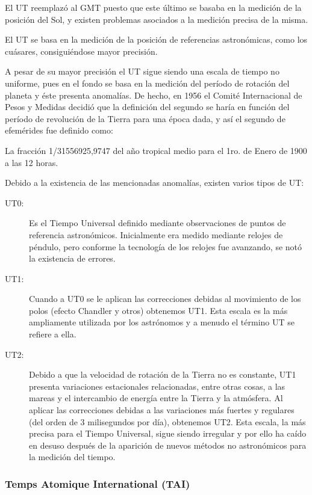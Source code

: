\documentclass[a4paper,12pt,twoside]{article}
\begin{document}
El UT reemplaz\'o al GMT puesto que este \'ultimo se basaba en la medici\'on de la posici\'on del Sol, y existen problemas asociados a la medici\'on precisa de la misma.

El UT se basa en la medici\'on de la posici\'on de referencias astron\'omicas, como los cu\'asares, consigui\'endose mayor precisi\'on.

 A pesar de su mayor precisión el UT sigue siendo una escala de tiempo no uniforme, pues en el fondo se basa en la medición del período de rotación del planeta y éste presenta anomalías. De hecho, en 1956 el Comité Internacional de Pesos y Medidas decidió que la definición del segundo se haría en función del período de revolución de la Tierra para una época dada, y así el segundo de efemérides fue definido como:

La fracción 1/31556925,9747 del año tropical medio para el 1ro. de Enero de 1900 a las 12 horas.

Debido a la existencia de las mencionadas anomalías, existen varios tipos de UT:
\begin{description}

\item [UT0:] Es el Tiempo Universal definido mediante observaciones de
  puntos de referencia astronómicos. Inicialmente era medido mediante
  relojes de péndulo, pero conforme la tecnología de los relojes fue
  avanzando, se notó la existencia de errores.


\item [UT1:] Cuando a UT0 se le aplican las correcciones debidas al
  movimiento de los polos (efecto Chandler y otros) obtenemos
  UT1. Esta escala es la más ampliamente utilizada por los astrónomos
  y a menudo el término UT se refiere a ella.


\item [UT2:] Debido a que la velocidad de rotación de la Tierra no es
  constante, UT1 presenta variaciones estacionales relacionadas, entre
  otras cosas, a las mareas y el intercambio de energía entre la
  Tierra y la atmósfera. Al aplicar las correcciones debidas a las
  variaciones más fuertes y regulares (del orden de 3 milisegundos por
  día), obtenemos UT2. Esta escala, la más precisa para el Tiempo
  Universal, sigue siendo irregular y por ello ha caído en desuso
  después de la aparición de nuevos métodos no astronómicos para la
  medición del tiempo.
\end{description}


\subsubsection{ Temps Atomique International (TAI)}
\label{sec:temps.atomique.international}
\end{document}
